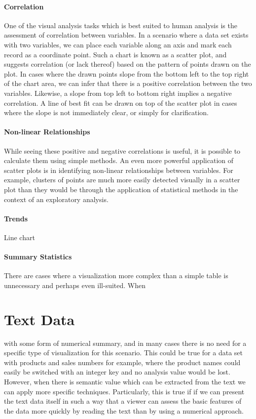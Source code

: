 \paragraph{Correlation}
One of the visual analysis tasks which is best suited to human analysis is the assessment of correlation between variables. In a scenario where a data set exists with two variables, we can place each variable along an axis and mark each record as a coordinate point. Such a chart is known as a scatter plot, and suggests correlation (or lack thereof) based on the pattern of points drawn on the plot. In cases where the drawn points slope from the bottom left to the top right of the chart area, we can infer that there is a positive correlation between the two variables. Likewise, a slope from top left to bottom right implies a negative correlation. A line of best fit can be drawn on top of the scatter plot in cases where the slope is not immediately clear, or simply for clarification. 

\paragraph{Non-linear Relationships}
While seeing these positive and negative correlations is useful, it is possible to calculate them using simple methods. An even more powerful application of scatter plots is in identifying non-linear relationships between variables. For example, clusters of points are much more easily detected visually in a scatter plot than they would be through the application of statistical methods in the context of an exploratory analysis.

\paragraph{Trends} 
Line chart

\paragraph{Summary Statistics}
There are cases where a visualization more complex than a simple table is unnecessary and perhaps even ill-suited. When 


\section{Text Data}
\label{sec:text_data}
 with some form of numerical summary, and in many cases there is no need for a specific type of visualization for this scenario. This could be true for a data set with products and sales numbers for example, where the product names could easily be switched with an integer key and no analysis value would be lost. However, when there is semantic value which can be extracted from the text we can apply more specific techniques. Particularly, this is true if if we can present the text data itself in such a way that a viewer can assess the basic features of the data more quickly by reading the text than by using a numerical approach.

